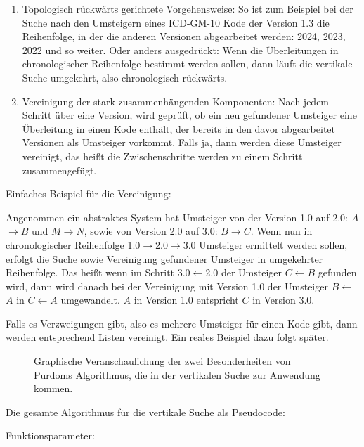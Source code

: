 \begin{enumerate}
\item Topologisch rückwärts gerichtete Vorgehensweise: So ist zum Beispiel bei der Suche nach den Umsteigern eines ICD-GM-10 Kode der Version 1.3 die Reihenfolge, in der die anderen Versionen abgearbeitet werden: 2024, 2023, 2022 und so weiter. Oder anders ausgedrückt: Wenn die Überleitungen in chronologischer Reihenfolge bestimmt werden sollen, dann läuft die vertikale Suche umgekehrt, also chronologisch rückwärts. 
\item Vereinigung der stark zusammenhängenden Komponenten: Nach jedem Schritt über eine Version, wird geprüft, ob ein neu gefundener Umsteiger eine Überleitung in einen Kode enthält, der bereits in den davor abgearbeitet Versionen als Umsteiger vorkommt. Falls ja, dann werden diese Umsteiger vereinigt, das heißt die Zwischenschritte werden zu einem Schritt zusammengefügt. 
\end{enumerate}

Einfaches Beispiel für die Vereinigung: 

Angenommen ein abstraktes System hat Umsteiger von der Version 1.0 auf 2.0: $A$$\rightarrow$$B$ und $M$$\rightarrow$$N$, sowie von Version 2.0 auf 3.0: $B$$\rightarrow$$C$. Wenn nun in chronologischer Reihenfolge 1.0$\rightarrow$2.0$\rightarrow$3.0 Umsteiger ermittelt werden sollen, erfolgt die Suche sowie Vereinigung gefundener Umsteiger in umgekehrter Reihenfolge. Das heißt wenn im Schritt 3.0$\leftarrow$2.0 der Umsteiger $C$$\leftarrow$$B$ gefunden wird, dann wird danach bei der Vereinigung mit Version 1.0 der Umsteiger $B$$\leftarrow$$A$ in $C$$\leftarrow$$A$ umgewandelt. $A$ in Version 1.0 entspricht $C$ in Version 3.0. 

Falls es Verzweigungen gibt, also es mehrere Umsteiger für einen Kode gibt, dann werden entsprechend Listen vereinigt. Ein reales Beispiel dazu folgt später. 

\begin{figure}[H]
    \centering\Huge%
    \resizebox{.75\linewidth}{!}{}
    \normalsize\caption{Graphische Veranschaulichung der zwei Besonderheiten von Purdoms Algorithmus, die in der vertikalen Suche zur Anwendung kommen.}
\end{figure}

Die gesamte Algorithmus für die vertikale Suche als Pseudocode:


Funktionsparameter:

